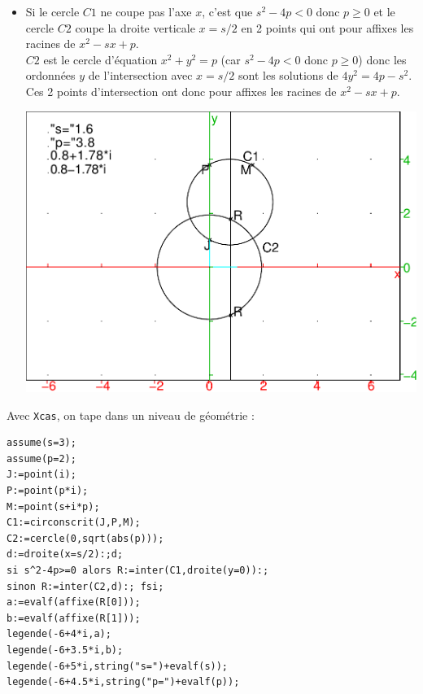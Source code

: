 \documentclass[a4paper,11pt]{book}
\begin{document}
\begin{itemize}
\item Si le cercle $C1$ ne coupe pas l'axe $x$, c'est que $s^2-4p< 0$ donc 
  $p\geq 0$ et le cercle $C2$ coupe la droite 
  verticale $x=s/2$ en 2 points qui ont pour affixes les racines de 
  $x^2-sx+p$.\\  
  $C2$ est le cercle d'\'equation $x^2+y^2=p$ (car $s^2-4p< 0$ donc $p\geq 0$) 
  donc les ordonn\'ees $y$ de l'intersection avec $x=s/2$ sont les solutions de 
  $4y^2=4p-s^2$.\\
  Ces 2 points d'intersection ont donc pour affixes les racines de $x^2-sx+p$.
  \begin{center}\includegraphics[width=\textwidth]{visutri1}\end{center}
\end{itemize}
Avec {\tt Xcas}, on tape dans un niveau de g\'eom\'etrie :
\begin{verbatim}
assume(s=3);
assume(p=2);
J:=point(i);
P:=point(p*i);
M:=point(s+i*p);
C1:=circonscrit(J,P,M);
C2:=cercle(0,sqrt(abs(p)));
d:=droite(x=s/2):;d;
si s^2-4p>=0 alors R:=inter(C1,droite(y=0)):; 
sinon R:=inter(C2,d):; fsi;
a:=evalf(affixe(R[0]));
b:=evalf(affixe(R[1]));
legende(-6+4*i,a);
legende(-6+3.5*i,b);
legende(-6+5*i,string("s=")+evalf(s));
legende(-6+4.5*i,string("p=")+evalf(p));
\end{verbatim}
\end{document}
